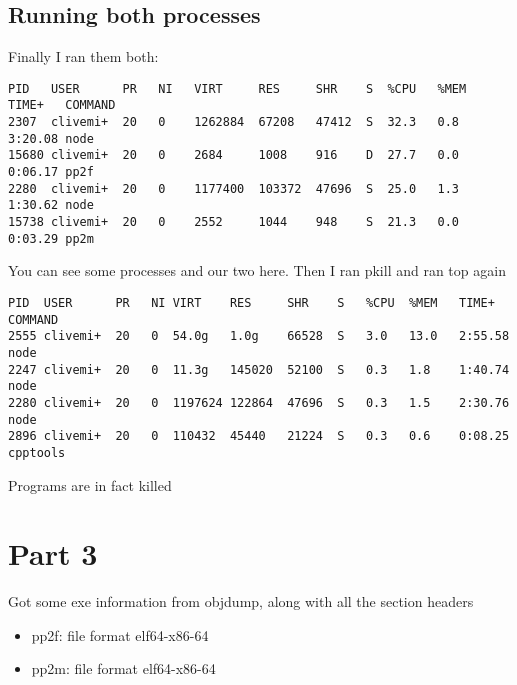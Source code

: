 \documentclass[11pt]{article}
\begin{document}
\subsection*{Running both processes}
Finally I ran them both:
\begin{lstlisting}[style=bash]
PID   USER      PR   NI   VIRT     RES     SHR    S  %CPU   %MEM  TIME+   COMMAND                                                                                                
2307  clivemi+  20   0    1262884  67208   47412  S  32.3   0.8   3:20.08 node
15680 clivemi+  20   0    2684     1008    916    D  27.7   0.0   0:06.17 pp2f                                                                                                                
2280  clivemi+  20   0    1177400  103372  47696  S  25.0   1.3   1:30.62 node                                                                     
15738 clivemi+  20   0    2552     1044    948    S  21.3   0.0   0:03.29 pp2m               
\end{lstlisting}

You can see some processes and our two here. Then I ran pkill and ran top again
\begin{lstlisting}[style=bash]
PID  USER      PR   NI VIRT    RES     SHR    S   %CPU  %MEM   TIME+   COMMAND                                                                                              
2555 clivemi+  20   0  54.0g   1.0g    66528  S   3.0   13.0   2:55.58 node                                                                                                       
2247 clivemi+  20   0  11.3g   145020  52100  S   0.3   1.8    1:40.74 node                                                                                                   
2280 clivemi+  20   0  1197624 122864  47696  S   0.3   1.5    2:30.76 node                                                                                                   
2896 clivemi+  20   0  110432  45440   21224  S   0.3   0.6    0:08.25 cpptools         
\end{lstlisting}

Programs are in fact killed

\section*{Part 3}
Got some exe information from objdump, along with all the section headers

\begin{itemize}
    \item pp2f: file format elf64-x86-64
    \item pp2m: file format elf64-x86-64
\end{itemize}
\end{document}
